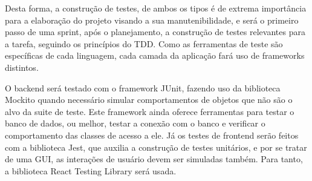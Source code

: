 Desta forma, a construção de testes, de ambos os tipos é de extrema
importância para a elaboração do projeto visando a sua
manutenibilidade, e será o primeiro passo de uma sprint, após o
planejamento, a construção de testes relevantes para a tarefa,
seguindo os princípios do TDD\cite{TDD}. Como as ferramentas de teste são
específicas de cada linguagem, cada camada da aplicação fará uso de
frameworks distintos.

O \gls{backend} será testado com o framework JUnit, fazendo uso da
biblioteca Mockito quando necessário simular comportamentos de objetos
que não são o alvo da suite de teste. Este framework ainda oferece
ferramentas para testar o banco de dados, ou melhor, testar a conexão
com o banco e verificar o comportamento das classes de acesso a ele.
Já os testes de \gls{frontend} serão feitos com a biblioteca Jest,
que auxilia a construção de testes unitários, e por se tratar de uma
\gls{GUI}, as interações de usuário devem ser simuladas também. Para tanto, a
biblioteca React Testing Library será usada.

